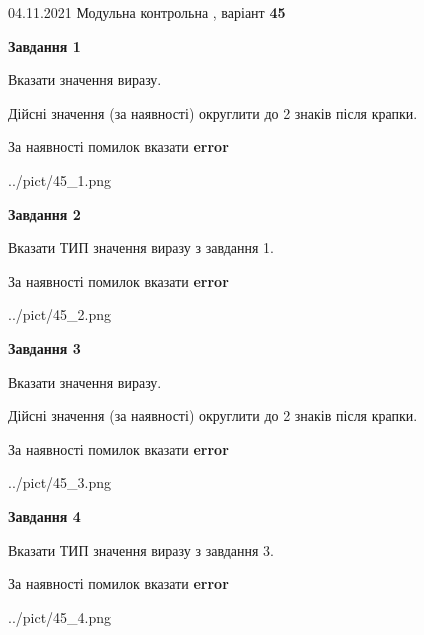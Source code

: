\documentclass[11pt, ukrainian]{article}
\begin{document}
{04.11.2021 Модульна контрольна , варіант  \No \textbf { 45 }\par}
{
\begin {large}
{\begin {center}\textbf{Завдання 1}\end {center}}\par
Вказати значення виразу. \par
Дійсні значення (за наявності) округлити до 2 знаків після крапки. \par
За наявності помилок вказати \textbf{error}

\begin{center}
	{../pict/45_1.png}
\end{center}
\newpage

{\begin {center}\textbf{Завдання 2}\end {center}}\par
Вказати ТИП значення виразу з завдання 1. \par
За наявності помилок вказати \textbf{error}

\begin{center}
	{../pict/45_2.png}
\end{center}
\newpage

{\begin {center}\textbf{Завдання 3}\end {center}}\par
Вказати значення виразу. \par
Дійсні значення (за наявності) округлити до 2 знаків після крапки. \par
За наявності помилок вказати \textbf{error}

\begin{center}
	{../pict/45_3.png}
\end{center}
\newpage

{\begin {center}\textbf{Завдання 4}\end {center}}\par
Вказати ТИП значення виразу з завдання 3. \par
За наявності помилок вказати \textbf{error}

\begin{center}
	{../pict/45_4.png}
\end{center}
\newpage


\end{large}}
\end{document}
